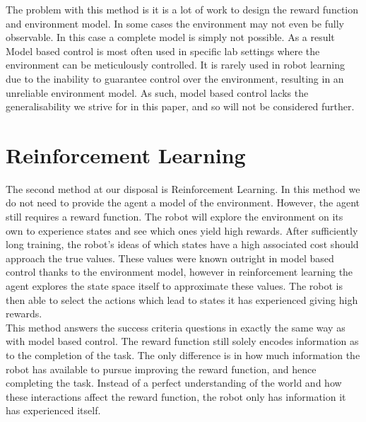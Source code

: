 The problem with this method is it is a lot of work to design the reward function and environment model. In some cases the environment may not even be fully observable. In this case a complete model is simply not possible. As a result Model based control is most often used in specific lab settings where the environment can be meticulously controlled. It is rarely used in  robot learning due to the inability to guarantee control over the environment, resulting in an unreliable environment model. As such, model based control lacks the generalisability we strive for in this paper, and so will not be considered further.

\section{Reinforcement Learning}
\label{sec:reinforcement-learning}
The second method at our disposal is Reinforcement Learning. In this method we do not need to provide the agent a model of the environment. However, the agent still requires a reward function. The robot will explore the environment on its own to experience states and see which ones yield high rewards. After sufficiently long training, the robot's ideas of which states have a high associated cost should approach the true values. These values were known outright in model based control thanks to the environment model, however in reinforcement learning the agent explores the state space itself to approximate these values. The robot is then able to select the actions which lead to states it has experienced giving high rewards.\\

This method answers the success criteria questions in exactly the same way as with model based control. The reward function still solely encodes information as to the completion of the task. The only difference is in how much information the robot has available to pursue improving the reward function, and hence completing the task. Instead of a perfect understanding of the world and how these interactions affect the reward function, the robot only has information it has experienced itself.\\

